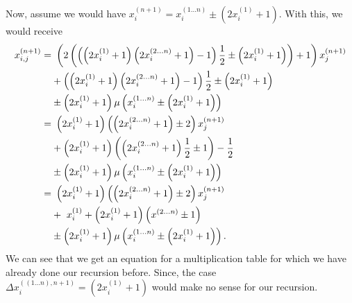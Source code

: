 Now, assume we would have $x_{i}^{\left(n+1\right)} = x_{i}^{\left(1 \dots n\right)} \pm \left(2x_{i}^{\left(1\right)} + 1\right)$. With this, we would receive
\begin{alignat}{3}
	x_{i,j}^{\left(n+1\right)} =& \ \left(2\left(\left(\left(2x_{i}^{\left(1\right)} + 1\right)\left(2x_{i}^{\left(2 \dots n\right)} + 1\right) - 1\right)\frac{1}{2} \pm \left(2x^{\left(1\right)}_{i} + 1\right)\right) + 1\right)x_{j}^{\left(n+1\right)} \notag \\
	&+ \left(\left(2x_{i}^{\left(1\right)} + 1\right)\left(2x_{i}^{\left(2 \dots n\right)} + 1\right) - 1\right)\frac{1}{2} \pm \left(2x_{i}^{\left(1\right)} + 1\right)\notag \\
	&\pm \left(2x_{i}^{\left(1\right)} + 1\right)\mu\left(x_{i}^{\left(1 \dots n\right)} \pm \left(2x_{i}^{\left(1\right)} + 1\right)\right) \notag \\
	=& \ \left(2x_{i}^{\left(1\right)} + 1\right)\left(\left(2x_{i}^{\left(2 \dots n\right)} + 1\right) \pm 2\right)x_{j}^{\left(n+1\right)} \notag \\
	&+ \left(2x_{i}^{\left(1\right)} + 1\right)\left(\left(2x_{i}^{\left(2 \dots n\right)} + 1\right)\frac{1}{2} \pm 1\right) - \frac{1}{2} \notag \\
	&\pm \left(2x_{i}^{\left(1\right)} + 1\right)\mu\left(x_{i}^{\left(1 \dots n\right)} \pm \left(2x_{i}^{\left(1\right)} + 1\right)\right) \notag \\
	=& \ \left(2x_{i}^{\left(1\right)} + 1\right)\left(\left(2x_{i}^{\left(2 \dots n\right)} + 1\right) \pm 2\right)x_{j}^{\left(n+1\right)} \notag \\
	&+ \ x_{i}^{\left(1\right)} + \left(2x_{i}^{\left(1\right)} + 1\right)\left(x^{\left(2 \dots n\right)} \pm 1\right) \notag \\ 
	&\pm \left(2x_{i}^{\left(1\right)} + 1\right)\mu\left(x_{i}^{\left(1 \dots n\right)} \pm \left(2x_{i}^{\left(1\right)} + 1\right)\right). \label{eq:deltafactorsense2}
\end{alignat}
We can see that we get an equation for a multiplication table for which we have already done our recursion before. Since, the case $\Delta x_{i}^{\left(\left(1 \dots n\right),n + 1\right)} = \left(2x_{i}^{\left(1\right)} + 1\right)$ would make no sense for our recursion.
 


















